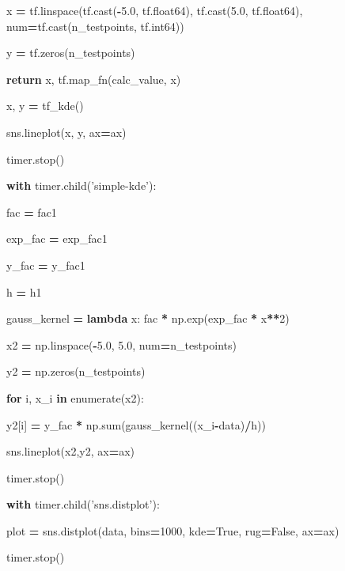 \documentclass[
  12pt,
  english,
  a4paper,
,tablecaptionabove
]{scrartcl}
\newenvironment{Shaded}{\begin{snugshade}}{\end{snugshade}}
\newcommand{\BuiltInTok}[1]{#1}
\newcommand{\ControlFlowTok}[1]{\textcolor[rgb]{0.13,0.29,0.53}{\textbf{#1}}}
\newcommand{\DecValTok}[1]{\textcolor[rgb]{0.00,0.00,0.81}{#1}}
\newcommand{\FloatTok}[1]{\textcolor[rgb]{0.00,0.00,0.81}{#1}}
\newcommand{\KeywordTok}[1]{\textcolor[rgb]{0.13,0.29,0.53}{\textbf{#1}}}
\newcommand{\NormalTok}[1]{#1}
\newcommand{\OperatorTok}[1]{\textcolor[rgb]{0.81,0.36,0.00}{\textbf{#1}}}
\newcommand{\StringTok}[1]{\textcolor[rgb]{0.31,0.60,0.02}{#1}}
\newcommand{\VariableTok}[1]{\textcolor[rgb]{0.00,0.00,0.00}{#1}}
\begin{document}
\begin{Shaded}
\begin{Highlighting}[]
\NormalTok{            x }\OperatorTok{=}\NormalTok{ tf.linspace(tf.cast(}\OperatorTok{-}\FloatTok{5.0}\NormalTok{, tf.float64), tf.cast(}\FloatTok{5.0}\NormalTok{, tf.float64), num}\OperatorTok{=}\NormalTok{tf.cast(n_testpoints, tf.int64))}

\NormalTok{            y }\OperatorTok{=}\NormalTok{ tf.zeros(n_testpoints)}

        

            \ControlFlowTok{return}\NormalTok{ x, tf.map_fn(calc_value, x)}

\NormalTok{        x, y }\OperatorTok{=}\NormalTok{ tf_kde()}

\NormalTok{        sns.lineplot(x, y, ax}\OperatorTok{=}\NormalTok{ax)}

\NormalTok{        timer.stop()}

    \ControlFlowTok{with}\NormalTok{ timer.child(}\StringTok{'simple-kde'}\NormalTok{):}

\NormalTok{        fac }\OperatorTok{=}\NormalTok{ fac1}

\NormalTok{        exp_fac }\OperatorTok{=}\NormalTok{ exp_fac1}

\NormalTok{        y_fac }\OperatorTok{=}\NormalTok{ y_fac1}

\NormalTok{        h }\OperatorTok{=}\NormalTok{ h1}

        

\NormalTok{        gauss_kernel }\OperatorTok{=} \KeywordTok{lambda}\NormalTok{ x: fac }\OperatorTok{*}\NormalTok{ np.exp(exp_fac }\OperatorTok{*}\NormalTok{ x}\OperatorTok{**}\DecValTok{2}\NormalTok{)}

\NormalTok{        x2 }\OperatorTok{=}\NormalTok{ np.linspace(}\OperatorTok{-}\FloatTok{5.0}\NormalTok{, }\FloatTok{5.0}\NormalTok{, num}\OperatorTok{=}\NormalTok{n_testpoints)     }

\NormalTok{        y2 }\OperatorTok{=}\NormalTok{ np.zeros(n_testpoints)}

        \ControlFlowTok{for}\NormalTok{ i, x_i }\KeywordTok{in} \BuiltInTok{enumerate}\NormalTok{(x2):}

\NormalTok{            y2[i] }\OperatorTok{=}\NormalTok{ y_fac }\OperatorTok{*}\NormalTok{ np.}\BuiltInTok{sum}\NormalTok{(gauss_kernel((x_i}\OperatorTok{-}\NormalTok{data)}\OperatorTok{/}\NormalTok{h))}

\NormalTok{        sns.lineplot(x2,y2, ax}\OperatorTok{=}\NormalTok{ax)}

\NormalTok{        timer.stop()}

    \ControlFlowTok{with}\NormalTok{ timer.child(}\StringTok{'sns.distplot'}\NormalTok{):}

\NormalTok{        plot }\OperatorTok{=}\NormalTok{ sns.distplot(data, bins}\OperatorTok{=}\DecValTok{1000}\NormalTok{, kde}\OperatorTok{=}\VariableTok{True}\NormalTok{, rug}\OperatorTok{=}\VariableTok{False}\NormalTok{, ax}\OperatorTok{=}\NormalTok{ax)}

\NormalTok{        timer.stop()}
\end{Highlighting}
\end{Shaded}
\end{document}
